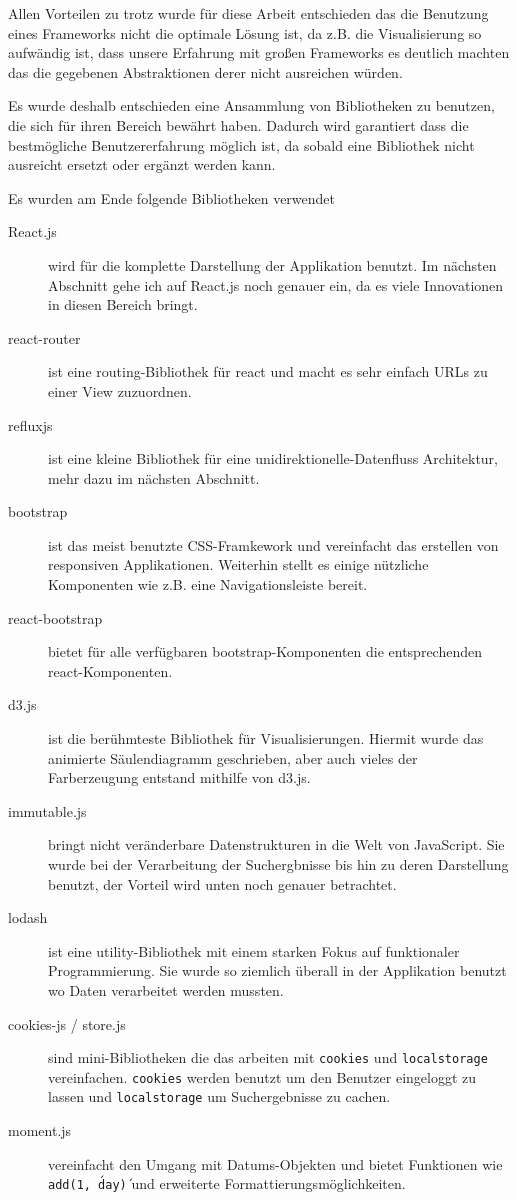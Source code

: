 \documentclass[12pt,twoside]{book}
\begin{document}
Allen Vorteilen zu trotz wurde für diese Arbeit entschieden das die Benutzung eines Frameworks nicht die optimale Lösung ist, da z.B. die Visualisierung so aufwändig ist, dass unsere Erfahrung mit großen Frameworks es deutlich machten das die gegebenen Abstraktionen derer nicht ausreichen würden.

Es wurde deshalb entschieden eine Ansammlung von Bibliotheken zu benutzen, die sich für ihren Bereich bewährt haben. Dadurch wird garantiert dass die bestmögliche Benutzererfahrung möglich ist, da sobald eine Bibliothek nicht ausreicht ersetzt oder ergänzt werden kann.

Es wurden am Ende folgende Bibliotheken verwendet

\begin{description}
	\item[React.js] wird für die komplette Darstellung der Applikation benutzt. Im nächsten Abschnitt gehe ich auf React.js noch genauer ein, da es viele Innovationen in diesen Bereich bringt.
	\item[react-router \cite{reactrouter}] ist eine routing-Bibliothek für react und macht es sehr einfach URLs zu einer View zuzuordnen.
	\item[refluxjs \cite{reflux}] ist eine kleine Bibliothek für eine unidirektionelle-Datenfluss Architektur, mehr dazu im nächsten Abschnitt.
	\item[bootstrap \cite{bootstrap}] ist das meist benutzte CSS-Framkework und vereinfacht das erstellen von responsiven Applikationen. Weiterhin stellt es einige nützliche Komponenten wie z.B. eine Navigationsleiste bereit.
	\item[react-bootstrap \cite{reactrouter}] bietet für alle verfügbaren bootstrap-Komponenten die entsprechenden react-Komponenten.
	\item[d3.js \cite{bostock2011d3}] ist die berühmteste Bibliothek für Visualisierungen. Hiermit wurde das animierte Säulendiagramm geschrieben, aber auch vieles der Farberzeugung entstand mithilfe von d3.js.
	\item[immutable.js \cite{Immutable}] bringt nicht veränderbare Datenstrukturen in die Welt von JavaScript. Sie wurde bei der Verarbeitung der Suchergbnisse bis hin zu deren Darstellung benutzt, der Vorteil wird unten noch genauer betrachtet.
	\item[lodash \cite{lodash}] ist eine utility-Bibliothek mit einem starken Fokus auf funktionaler Programmierung. Sie wurde so ziemlich überall in der Applikation benutzt wo Daten verarbeitet werden mussten.
	\item[cookies-js \cite{cookiesjs} / store.js \cite{storejs}]sind mini-Bibliotheken die das arbeiten mit \texttt{cookies} und \texttt{localstorage} vereinfachen. \texttt{cookies} werden benutzt um den Benutzer eingeloggt zu lassen und \texttt{localstorage} um Suchergebnisse zu cachen.
	\item[moment.js\cite{momentjs}] vereinfacht den Umgang mit Datums-Objekten und bietet Funktionen wie \texttt{add(1, \'day\')} und erweiterte Formattierungsmöglichkeiten.
\end{description}
\end{document}

